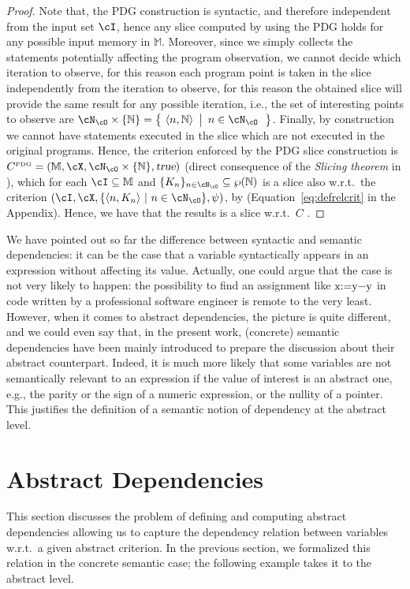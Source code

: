 \documentclass[prodmode,acmtocl]{acmsmall}
\def\memories{\ensuremath{\mathbb{M}}\xspace}
\def\crit{\ensuremath{C}\xspace}
\newcommand{\sset}[2]{\left\{~#1 ~ \left |
                               \begin{array}{l}#2\end{array}
                          \right.     \right\}}
\newcommand{\true}{\mbox{\sl true}}
\def\tuple#1{\langle #1 \rangle}
\newcommand{\0}{\mbox{\bf 0}}
\newcommand{\CODE}[1]{\ensuremath{\mbox{\lstinline!#1!}\xspace}\xspace}
\def\NATURALS{\mathbb{N}}
\begin{document}
\begin{proof}
  Note that, the PDG construction is syntactic, and therefore
  independent from the input set $\cI$, hence any slice computed by
  using the PDG holds for any possible input memory in
  $\memories$. Moreover, since we simply collects the statements
  potentially affecting the program observation, we cannot decide
  which iteration to observe, for this reason each program point is
  taken in the slice independently from the iteration to observe, for
  this reason the obtained slice will provide the same result for any
  possible iteration, i.e., the set of interesting points to observe
  are
  $\cN_\cO\times\{\NATURALS\}=\sset{\tuple{n,\NATURALS}}{n\in\cN_{\cO}}$. Finally,
  by construction we cannot have statements executed in the slice
  which are not executed in the original programs. Hence, the
  criterion enforced by the PDG slice construction is
  $\crit^{\mbox{\tiny
      PDG}}=(\memories,\cX,\cN_\cO\times\{\NATURALS\},\true)$ (direct
  consequence of the \emph{Slicing theorem} in \cite{RY88}), which for
  each $\cI\subseteq\memories$ and
  $\{K_n\}_{n\in\cN_\cO}\subseteq\wp(\NATURALS)$ is a slice also
  w.r.t.\ the criterion
  $(\cI,\cX,\{\tuple{n,K_n}~|~n\in\cN_\cO\},\psi)$, by \cite{AForm}
  (Equation~\ref{eq:defrelcrit} in the Appendix). Hence, we have that
  the results is a slice w.r.t.\ $\crit$ \cite{AForm}.
\end{proof}

We have pointed out so far the difference between syntactic and
semantic dependencies: it can be the case that a variable
syntactically appears in an expression without affecting its value.
Actually, one could argue that the case is not very likely to happen:
the possibility to find an assignment like \CODE{x:=y-y} in code
written by a professional software engineer is remote to the very
least.  However, when it comes to abstract dependencies, the picture
is quite different, and we could even say that, in the present work,
(concrete) semantic dependencies have been mainly introduced to
prepare the discussion about their abstract counterpart.  Indeed, it
is much more likely that some variables are not semantically relevant
to an expression if the value of interest is an abstract one, e.g.,
the parity or the sign of a numeric expression, or the nullity of a
pointer.  This justifies the definition of a semantic notion of
dependency at the abstract level.


\section{Abstract Dependencies}
\label{sec:abstractDependencies}
This section discusses the problem of defining and computing abstract
dependencies allowing us to capture the dependency relation between
variables w.r.t.\ a given abstract criterion.  In the previous
section, we formalized this relation in the concrete semantic case;
the following example takes it to the abstract level.
\end{document}
